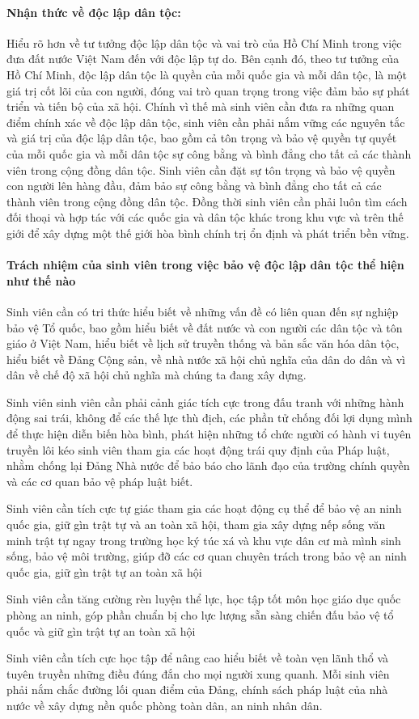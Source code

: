 \paragraph{Nhận thức về độc lập dân tộc:}
Hiểu rõ hơn về tư tưởng độc lập dân tộc và vai trò của Hồ Chí Minh trong việc đưa đất nước Việt Nam đến với độc lập tự do. Bên cạnh đó, theo tư tưởng của Hồ Chí Minh, độc lập dân tộc là quyền của mỗi quốc gia và mỗi dân tộc, là một giá trị cốt lõi của con người, đóng vai trò quan trọng trong việc đảm bảo sự phát triển và tiến bộ của xã hội. Chính vì thế mà sinh viên cần đưa ra những quan điểm chính xác về độc lập dân tộc, sinh viên cần phải nắm vững các nguyên tắc và giá trị của độc lập dân tộc, bao gồm cả tôn trọng và bảo vệ quyền tự quyết của mỗi quốc gia và mỗi dân tộc sự công bằng và bình đẳng cho tất cả các thành viên trong cộng đồng dân tộc. Sinh viên cần đặt sự tôn trọng và bảo vệ quyền con người lên hàng đầu, đảm bảo sự công bằng và bình đẳng cho tất cả các thành viên trong cộng đồng dân tộc. Đồng thời sinh viên cần phải luôn tìm cách đối thoại và hợp tác với các quốc gia và dân tộc khác trong khu vực và trên thế giới để xây dựng một thế giới hòa bình chính trị ổn định và phát triển bền vững.

\paragraph{Trách nhiệm của sinh viên trong việc bảo vệ độc lập dân tộc thể hiện như thế nào}
Sinh viên cần có tri thức hiểu biết về những vấn đề có liên quan đến sự nghiệp bảo vệ Tổ quốc, bao gồm hiểu biết về đất nước và con người các dân tộc và tôn giáo ở Việt Nam, hiểu biết về lịch sử truyền thống và bản sắc văn hóa dân tộc, hiểu biết về Đảng Cộng sản, về nhà nước xã hội chủ nghĩa của dân do dân và vì dân về chế độ xã hội chủ nghĩa mà chúng ta đang xây dựng.

Sinh viên sinh viên cần phải cảnh giác tích cực trong đấu tranh với những hành động sai trái, không để các thế lực thù địch, các phần tử chống đối lợi dụng mình để thực hiện diễn biến hòa bình, phát hiện những tổ chức người có hành vi tuyên truyền lôi kéo sinh viên tham gia các hoạt động trái quy định của Pháp luật, nhằm chống lại Đảng Nhà nước để bảo báo cho lãnh đạo của trường chính quyền và các cơ quan bảo vệ pháp luật biết.

Sinh viên cần tích cực tự giác tham gia các hoạt động cụ thể để bảo vệ an ninh quốc gia, giữ gìn trật tự và an toàn xã hội, tham gia xây dựng nếp sống văn minh trật tự ngay trong trường học ký túc xá và khu vực dân cư mà mình sinh sống, bảo vệ môi trường, giúp đỡ các cơ quan chuyên trách trong bảo vệ an ninh quốc gia, giữ gìn trật tự an toàn xã hội

Sinh viên cần tăng cường rèn luyện thể lực, học tập tốt môn học giáo dục quốc phòng an ninh, góp phần chuẩn bị cho lực lượng sẵn sàng chiến đấu bảo vệ tổ quốc và giữ gìn trật tự an toàn xã hội

Sinh viên cần tích cực học tập để nâng cao hiểu biết về toàn vẹn lãnh thổ và tuyên truyền những điều đúng đắn cho mọi người xung quanh. Mỗi sinh viên phải nắm chắc đường lối quan điểm của Đảng, chính sách pháp luật của nhà nước về xây dựng nền quốc phòng toàn dân, an ninh nhân dân.